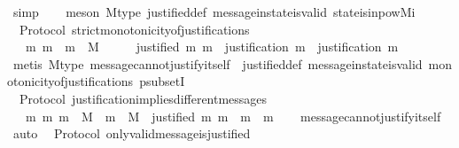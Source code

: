 \begin{isabellebody}
\isamarkupfalse%
\ simp\isanewline
\ \ \isamarkupfalse%
\ {\isacharparenleft}meson\ M{\isacharunderscore}type\ justified{\isacharunderscore}def\ message{\isacharunderscore}in{\isacharunderscore}state{\isacharunderscore}is{\isacharunderscore}valid\ state{\isacharunderscore}is{\isacharunderscore}in{\isacharunderscore}pow{\isacharunderscore}M{\isacharunderscore}i{\isacharparenright}%
\endisatagproof
{\isafoldproof}%
%
\isadelimproof
\isanewline
%
\endisadelimproof
\isanewline
{}\isamarkupfalse%
\ {\isacharparenleft}\ Protocol{\isacharparenright}\ strict{\isacharunderscore}monotonicity{\isacharunderscore}of{\isacharunderscore}justifications\ {\isacharcolon}\isanewline
\ \ {\isachardoublequoteopen}{\isasymforall}\ m\ m{\isacharprime}\ {\isasymsigma}{\isachardot}\ m\ {\isasymin}\ M\ {\isasymand}\ {\isasymsigma}\ {\isasymin}\ {\isasymSigma}\ {\isasymand}\ justified\ m{\isacharprime}\ m\ {\isasymlongrightarrow}\ justification\ m{\isacharprime}\ {\isasymsubset}\ justification\ m{\isachardoublequoteclose}\isanewline
%
\isadelimproof
\ \ %
\endisadelimproof
%
\isatagproof
{}\isamarkupfalse%
\ {\isacharparenleft}metis\ M{\isacharunderscore}type\ message{\isacharunderscore}cannot{\isacharunderscore}justify{\isacharunderscore}itself\ \ justified{\isacharunderscore}def\ message{\isacharunderscore}in{\isacharunderscore}state{\isacharunderscore}is{\isacharunderscore}valid\ monotonicity{\isacharunderscore}of{\isacharunderscore}justifications\ psubsetI{\isacharparenright}%
\endisatagproof
{\isafoldproof}%
%
\isadelimproof
\isanewline
%
\endisadelimproof
\isanewline
{}\isamarkupfalse%
\ {\isacharparenleft}\ Protocol{\isacharparenright}\ justification{\isacharunderscore}implies{\isacharunderscore}different{\isacharunderscore}messages\ {\isacharcolon}\isanewline
\ \ {\isachardoublequoteopen}{\isasymforall}\ m\ m{\isacharprime}{\isachardot}\ m\ {\isasymin}\ M\ {\isasymand}\ m{\isacharprime}\ {\isasymin}\ M\ {\isasymlongrightarrow}\ justified\ m{\isacharprime}\ m\ {\isasymlongrightarrow}\ m\ {\isasymnoteq}\ m{\isacharprime}{\isachardoublequoteclose}\isanewline
%
\isadelimproof
\ \ %
\endisadelimproof
%
\isatagproof
{}\isamarkupfalse%
\ message{\isacharunderscore}cannot{\isacharunderscore}justify{\isacharunderscore}itself\ \isamarkupfalse%
\ auto%
\endisatagproof
{\isafoldproof}%
%
\isadelimproof
\isanewline
%
\endisadelimproof
\isanewline
{}\isamarkupfalse%
\ {\isacharparenleft}\ Protocol{\isacharparenright}\ only{\isacharunderscore}valid{\isacharunderscore}message{\isacharunderscore}is{\isacharunderscore}justified\ {\isacharcolon}\isanewline

\end{isabellebody}
